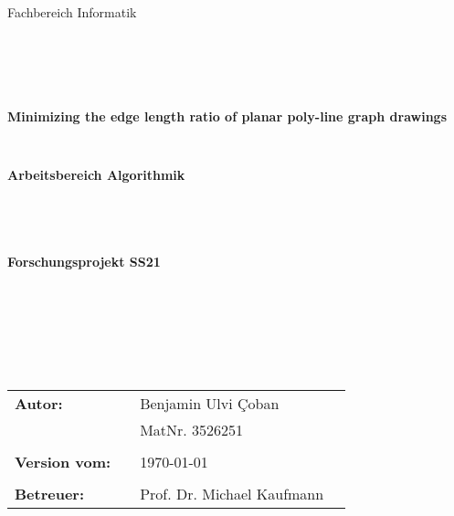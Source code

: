 \begin{center}
	\Large{Fachbereich Informatik}
\end{center}
\begin{verbatim}
	
	
	
	
\end{verbatim}
\begin{center}
	\textbf{\LARGE{Minimizing the edge length ratio of planar poly-line graph drawings}}\\
	\begin{verbatim}
		
	\end{verbatim}
	\textbf{{Arbeitsbereich Algorithmik}}
\end{center}
\begin{verbatim}
	
\end{verbatim}
\begin{center}
	
\end{center}
\begin{verbatim}
	
\end{verbatim}
\begin{center}
	\textbf{Forschungsprojekt SS21}
\end{center}
\begin{verbatim}
	
	
	
	
	
	
\end{verbatim}
\begin{flushleft}
	\begin{tabular}{llll}
		\textbf{Autor:} & & Benjamin Ulvi \c Coban & \\
		& & MatNr. 3526251 & \\
		& & \\
		\textbf{Version vom:} & & \today &\\
		& & \\
		\textbf{Betreuer:} & & Prof. Dr. Michael Kaufmann &\\
	\end{tabular}
\end{flushleft}